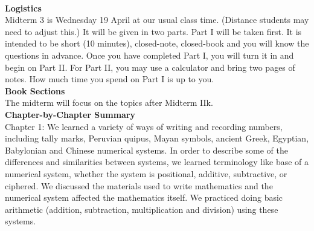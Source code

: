 \documentclass[11pt,fleqn]{article}
\begin{document}
\renewcommand{\headrulewidth}{0pt}
\newcommand{\blank}[1]{\rule{#1}{0.75pt}}
\newcommand{\bc}{\begin{center}}
\newcommand{\ec}{\end{center}}
\renewcommand{\d}{\displaystyle}

\vspace*{-0.7in}

\begin{center}
  \large
  \\
\end{center}
\noindent\textbf{Logistics}\\

Midterm 3 is Wednesday 19 April at our usual class time. (Distance students may need to adjust this.) It will be given in two parts. Part I will be taken first. It is intended to be short (10 minutes), closed-note, closed-book and you will know the questions in advance. Once you have completed Part I, you will turn it in and begin on Part II.  For Part II, you may use a calculator and bring two pages of notes. How much time you spend on Part I is up to you.  \\

\noindent\textbf{Book Sections}\\

The midterm will focus on the topics after Midterm IIk.\\

\noindent\textbf{Chapter-by-Chapter Summary}\\

Chapter 1: We learned a variety of ways of writing and recording numbers, including tally marks,  Peruvian quipus, Mayan symbols, ancient Greek, Egyptian, Babylonian and Chinese numerical systems. In order to describe some of the differences and similarities between systems, we learned terminology like base of a numerical system, whether the system is positional, additive, subtractive,  or ciphered. We discussed the materials used to write mathematics and the numerical system affected the mathematics itself. We practiced doing basic arithmetic (addition, subtraction, multiplication and division) using these systems.\\
\end{document}
